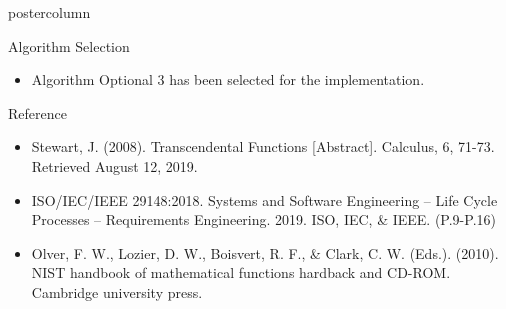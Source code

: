 \documentclass[final,hyperref={pdfpagelabels=false}]{beamer}
\begin{document}
\begin{frame}
\begin{columns}
\begin{column}{.49\textwidth}
\begin{beamercolorbox}[center,wd=\textwidth]{postercolumn}
\begin{minipage}[T]{.95\textwidth}
{\begin{block}{Algorithm Selection}
\begin{itemize}
\begin{itemize}
                \end{itemize}
                
                   \item Algorithm Optional 3 has been selected for the implementation.


                
                
        
                
                
      
              \end{itemize}
            \end{block}
            \vfill
  
  
  
         
            \begin{block}{Reference}
            \begin{itemize}
           
              
             
              \item      Stewart, J. (2008). Transcendental Functions [Abstract]. Calculus, 6, 71-73. Retrieved August 12, 2019.
              
                     \item ISO/IEC/IEEE 29148:2018. Systems and Software Engineering -- Life Cycle Processes -- Requirements Engineering. 2019. ISO, IEC, & IEEE. (P.9-P.16)
\\

\item Olver, F. W., Lozier, D. W., Boisvert, R. F., & Clark, C. W. (Eds.). (2010). NIST handbook of mathematical functions hardback and CD-ROM. Cambridge university press.

      
              \end{itemize}
            \end{block}
            \vfill
  
            
           
            
          }
        \end{minipage}
      \end{beamercolorbox}
    \end{column}


\end{columns}
\end{frame}
\end{document}
